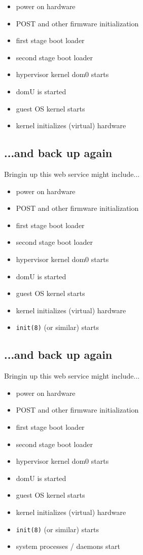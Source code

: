 \documentclass[xga]{xdvislides}
\begin{document}
\begin{itemize}
	\item power on hardware
	\item POST and other firmware initialization
	\item first stage boot loader
	\item second stage boot loader
	\item hypervisor kernel dom0 starts
	\item domU is started
	\item guest OS kernel starts
	\item kernel initializes (virtual) hardware
\end{itemize}

\subsection{...and back up again}
Bringin up this web service might include...
\\

\begin{itemize}
	\item power on hardware
	\item POST and other firmware initialization
	\item first stage boot loader
	\item second stage boot loader
	\item hypervisor kernel dom0 starts
	\item domU is started
	\item guest OS kernel starts
	\item kernel initializes (virtual) hardware
	\item {\tt init(8)} (or similar) starts
\end{itemize}

\subsection{...and back up again}
Bringin up this web service might include...
\\

\begin{itemize}
	\item power on hardware
	\item POST and other firmware initialization
	\item first stage boot loader
	\item second stage boot loader
	\item hypervisor kernel dom0 starts
	\item domU is started
	\item guest OS kernel starts
	\item kernel initializes (virtual) hardware
	\item {\tt init(8)} (or similar) starts
	\item system processes / daemons start
\end{itemize}
\end{document}
